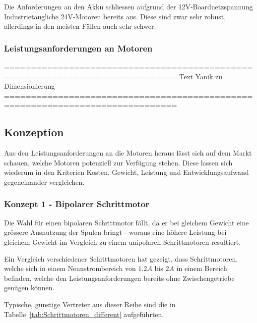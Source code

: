 \documentclass[main.tex]{subfiles} %
\begin{document}
Die Anforderungen an den Akku schliessen aufgrund der 12V-Boardnetzspannung
Industrietaugliche 24V-Motoren bereits aus. Diese sind zwar sehr robust,
allerdings in den meisten Fällen auch sehr schwer.

\subsubsection*{Leistungsanforderungen an Motoren}

==============================================================================
Text Yanik zu Dimensionierung
==============================================================================

\subsection*{Konzeption}

Aus den Leistungsanforderungen an die Motoren heraus lässt sich auf dem Markt
schauen, welche Motoren potenziell zur Verfügung stehen. Diese lassen sich
wiederum in den Kriterien Kosten, Gewicht, Leistung und Entwicklungsaufwand
gegeneinander vergleichen.

\subsubsection*{Konzept 1 - Bipolarer Schrittmotor} %

Die Wahl für einen bipolaren Schrittmotor fällt, da er bei gleichem Gewicht
eine grössere Ausnutzung der Spulen bringt - woraus eine höhere Leistung bei
gleichem Gewicht im Vergleich zu einem unipolaren Schrittmotoren resultiert.

Ein Vergleich verschiedener Schrittmotoren hat gezeigt, dass Schrittmotoren,
welche sich in einem Nennstrombereich von $1.2A$ bis $2A$ in einem Bereich
befinden, welche den Leistungsanforderungen bereits ohne Zwischengetriebe
genügen können.

Typische, günstige Vertreter aus dieser Reihe sind die in
Tabelle~\ref{tab:Schrittmotoren_different} aufgeführten.
\end{document}
